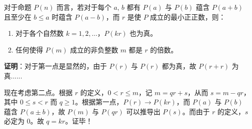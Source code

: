 
\begin{lemma}{}
对于命题 $P(n)$ 而言，若对于每个 $a$, $b$ 都有 $P(a)$ 与 $P(b)$ 蕴含 $P(a+b)$ 且至少在 $b \le a$ 时蕴含 $P(a-b)$，而 $r$ 是使 $P$ 成立的最小正正数，则：
\begin{enumerate}
\item 对于各个自然数 $k = 1, 2, \dots$，$P(kr)$ 也为真。
\item 任何使得 $P(m)$ 成立的非负整数 $m$ 都是 $r$ 的倍数。
\end{enumerate}
\end{lemma}
\textbf{证明}：对于第一点是显然的，由于 $P(r)$ 与 $P(r)$ 都为真，故 $P(r+r)$ 为真......

现在考虑第二点。根据 $r$ 的定义，$0 < r \le m$，记 $m = qr + s$，从而 $s = m - qr$，其中 $0 \le s < r$ 而 $q \ge 1$。根据第一点，$P(r) \rightarrow P(kr)$，而 $P(a)$ 与 $P(b)$ 蕴含 $P(a \pm b)$，故 $P(m)$ 与 $P(qr)$ 可以推导出 $P(s)$。而由于 $r$ 的定义，$s$ 必定为 $0$。故 $q = kr$。证毕！

